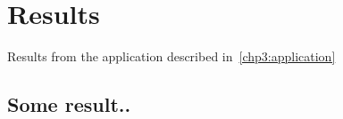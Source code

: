 \chapter{Results}
Results from the application described in~\autoref{chp3:application}

\section{Some result..}
